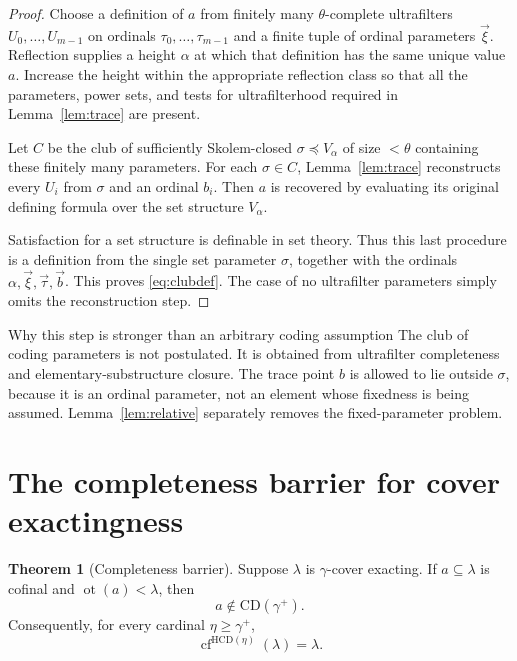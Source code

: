 \documentclass[11pt,letterpaper]{article}
\theoremstyle{definition}
\newtheorem{theorem}[definition]{Theorem}
\newcommand{\cf}{\operatorname{cf}}
\newcommand{\ot}{\operatorname{ot}}
\newcommand{\CD}{\mathrm{CD}}
\newcommand{\HCD}{\mathrm{HCD}}
\begin{document}
\begin{proof}
Choose a definition of $a$ from finitely many $\theta$-complete ultrafilters $U_0,\ldots,U_{m-1}$ on ordinals $\tau_0,\ldots,\tau_{m-1}$ and a finite tuple of ordinal parameters $\vec\xi$. Reflection supplies a height $\alpha$ at which that definition has the same unique value $a$. Increase the height within the appropriate reflection class so that all the parameters, power sets, and tests for ultrafilterhood required in Lemma~\ref{lem:trace} are present.

Let $C$ be the club of sufficiently Skolem-closed $\sigma\preceq V_\alpha$ of size $<\theta$ containing these finitely many parameters. For each $\sigma\in C$, Lemma~\ref{lem:trace} reconstructs every $U_i$ from $\sigma$ and an ordinal $b_i$. Then $a$ is recovered by evaluating its original defining formula over the set structure $V_\alpha$.

Satisfaction for a set structure is definable in set theory. Thus this last procedure is a definition from the single set parameter $\sigma$, together with the ordinals $\alpha,\vec\xi,\vec\tau,\vec b$. This proves \eqref{eq:clubdef}. The case of no ultrafilter parameters simply omits the reconstruction step.
\end{proof}

\begin{assessment}{Why this step is stronger than an arbitrary coding assumption}
The club of coding parameters is not postulated. It is obtained from ultrafilter completeness and elementary-substructure closure. The trace point $b$ is allowed to lie outside $\sigma$, because it is an ordinal parameter, not an element whose fixedness is being assumed. Lemma~\ref{lem:relative} separately removes the fixed-parameter problem.
\end{assessment}

\section{The completeness barrier for cover exactingness}\label{sec:barrier}

\begin{theorem}[Completeness barrier]\label{thm:barrier}
Suppose $\lambda$ is $\gamma$-cover exacting. If $a\subseteq\lambda$ is cofinal and $\ot(a)<\lambda$, then
\begin{equation}\label{eq:barrier}
              a\notin\CD(\gamma^+).
\end{equation}
Consequently, for every cardinal $\eta\geq\gamma^+$,
\begin{equation}\label{eq:regularhcd}
               \cf^{\HCD(\eta)}(\lambda)=\lambda.
\end{equation}
\end{theorem}
\end{document}
